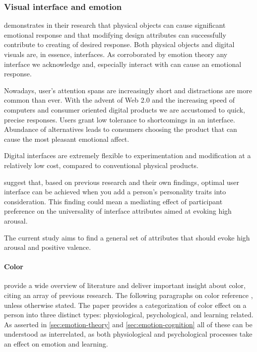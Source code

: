 		
		\subsubsection{Visual interface and emotion}
		
		\cite{Desmet2007} demonstrates in their research that physical objects can cause significant emotional response and that modifying design attributes can successfully contribute to creating of desired response.
		Both physical objects and digital visuals are, in essence, interfaces. As corroborated by emotion theory any interface we acknowledge and, especially interact with can cause an emotional response. 
		
		Nowadays, user's attention spans are increasingly short and distractions are more common than ever. With the advent of Web 2.0 and the increasing speed of computers and consumer oriented digital products we are accustomed to quick, precise responses. Users grant low tolerance to shortcomings in an interface. Abundance of alternatives leads to consumers choosing the product that can cause the most pleasant emotional affect.
		
 		Digital interfaces are extremely flexible to experimentation and modification at a relatively low cost, compared to conventional physical products.
 		
		
		
		
		\cite{Arockiam2013} suggest that, based on previous research and their own findings, optimal user interface can be achieved when you add a person's personality traits into consideration. This finding could mean a mediating effect of participant preference on the universality of interface attributes aimed at evoking high arousal. 
		
		The current study aims to find a general set of attributes that should evoke high arousal and positive valence.
		
		\paragraph{Color}
		
		\cite{Pett1996} provide a wide overview of literature and deliver important insight about color, citing an array of previous research. The following paragraphs on color reference \cite{Pett1996}, unless otherwise stated. The paper provides a categorization of color effect on a person into three distinct types: physiological, psychological, and learning related. As asserted in \ref{sec:emotion-theory} and \ref{sec:emotion-cognition} all of these can be understood as interrelated, as both physiological and psychological processes take an effect on emotion and learning.
						
